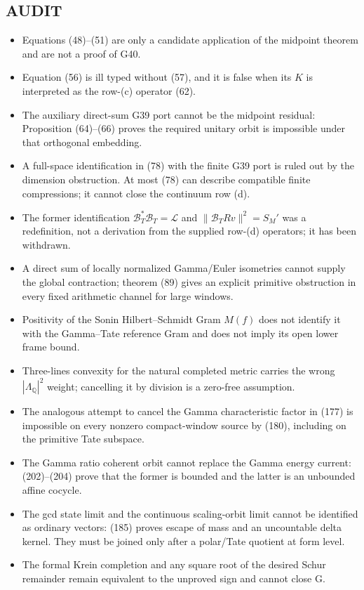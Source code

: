 \documentclass[11pt]{article}
\newcommand{\cL}{\mathscr L}
\begin{document}
\subsection*{AUDIT}
\begin{itemize}
\item Equations (48)--(51) are only a candidate application of the midpoint
      theorem and are not a proof of G40.
\item Equation (56) is ill typed without (57), and it is false when its $K$ is
      interpreted as the row-(c) operator (62).
\item The auxiliary direct-sum G39 port cannot be the midpoint residual:
      Proposition (64)--(66) proves the required unitary orbit is impossible
      under that orthogonal embedding.
\item A full-space identification in (78) with the finite G39 port is ruled
      out by the dimension obstruction.  At most (78) can describe compatible
      finite compressions; it cannot close the continuum row (d).
\item The former identification
      $\mathcal B_T^*\mathcal B_T=\cL$ and
      $\|\mathcal B_TRv\|^2=S_M'$ was a redefinition, not a derivation from
      the supplied row-(d) operators; it has been withdrawn.
\item A direct sum of locally normalized Gamma/Euler isometries cannot supply
      the global contraction; theorem (89) gives an explicit primitive
      obstruction in every fixed arithmetic channel for large windows.
\item Positivity of the Sonin Hilbert--Schmidt Gram $M(f)$ does not identify
      it with the Gamma--Tate reference Gram and does not imply its open lower
      frame bound.
\item Three-lines convexity for the natural completed metric carries the
      wrong $|\Lambda_{\mathbb Q}|^2$ weight; cancelling it by division is a
      zero-free assumption.
\item The analogous attempt to cancel the Gamma characteristic factor in
      (177) is impossible on every nonzero compact-window source by (180),
      including on the primitive Tate subspace.
\item The Gamma ratio coherent orbit cannot replace the Gamma energy current:
      (202)--(204) prove that the former is bounded and the latter is an
      unbounded affine cocycle.
\item The gcd state limit and the continuous scaling-orbit limit cannot be
      identified as ordinary vectors: (185) proves escape of mass and an
      uncountable delta kernel.  They must be joined only after a polar/Tate
      quotient at form level.
\item The formal Krein completion and any square root of the desired Schur
      remainder remain equivalent to the unproved sign and cannot close G.
\end{itemize}
\end{document}
